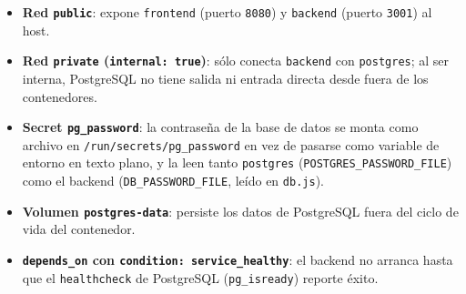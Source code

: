 \begin{itemize}
    \item \textbf{Red \texttt{public}}: expone \texttt{frontend} (puerto \texttt{8080}) y \texttt{backend} (puerto \texttt{3001}) al host.
    \item \textbf{Red \texttt{private} (\texttt{internal: true})}: sólo conecta \texttt{backend} con \texttt{postgres}; al ser interna, PostgreSQL no tiene salida ni entrada directa desde fuera de los contenedores.
    \item \textbf{Secret \texttt{pg\_password}}: la contraseña de la base de datos se monta como archivo en \texttt{/run/secrets/pg\_password} en vez de pasarse como variable de entorno en texto plano, y la leen tanto \texttt{postgres} (\texttt{POSTGRES\_PASSWORD\_FILE}) como el backend (\texttt{DB\_PASSWORD\_FILE}, leído en \texttt{db.js}).
    \item \textbf{Volumen \texttt{postgres-data}}: persiste los datos de PostgreSQL fuera del ciclo de vida del contenedor.
    \item \textbf{\texttt{depends\_on} con \texttt{condition: service\_healthy}}: el backend no arranca hasta que el \texttt{healthcheck} de PostgreSQL (\texttt{pg\_isready}) reporte éxito.
\end{itemize}

